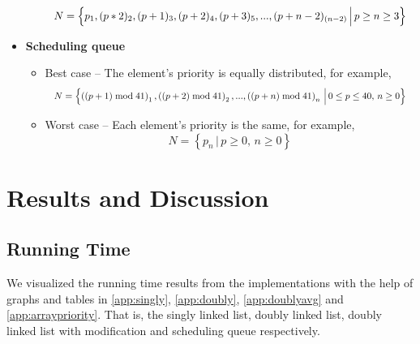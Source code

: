 \documentclass[a4paper,11pt]{kth-mag}
\begin{document}
\begin{itemize}
\begin{itemize}
                \begin{equation*}
                    \resizebox{.9\hsize}{!}{$N = \left\{p_1, (p*2)_2, (p+1)_3, (p+2)_4, (p+3)_5,..., (p+n-2)_{(n-2)} \, \Big| \, p \ge n \ge 3 \right\}$}
                \end{equation*}
        \end{itemize}
    \item \textbf{Scheduling queue}
        \begin{itemize}
            \item Best case -- The element's priority is equally distributed, for example,
                \begin{equation*}
                    \resizebox{.9\hsize}{!}{$N = \left\{\left((p+1) \bmod 41\right)_1, \left((p+2) \bmod 41\right)_2,..., \left((p+n) \bmod 41\right)_n \, \Big| \, 0 \le p \le 40, \, n \ge 0\right\}$}
                \end{equation*}
            \item Worst case -- Each element's priority is the same, for example,
                \begin{equation*}
                    N = \left\{p_{n} \, \Big| \, p \ge 0,\, n \ge 0 \right\}
                \end{equation*}
        \end{itemize}
\end{itemize}


\chapter{Results and Discussion}\label{chapter:results}

\section{Running Time}
We visualized the running time results from the implementations with the help of graphs and tables in \cref{app:singly}, \cref{app:doubly}, \cref{app:doublyavg} and \cref{app:arraypriority}.
That is, the singly linked list, doubly linked list, doubly linked list with modification and scheduling queue respectively.
\end{document}
